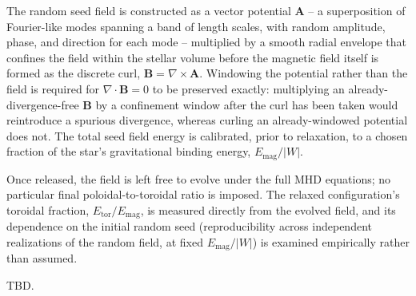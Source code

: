 \documentclass{aa}
\begin{document}
The random seed field is constructed as a vector potential $\mathbf{A}$
-- a superposition of Fourier-like modes spanning a band of length
scales, with random amplitude, phase, and direction for each mode --
multiplied by a smooth radial envelope that confines the field within
the stellar volume before the magnetic field itself is formed as the
discrete curl, $\mathbf{B} = \nabla\times\mathbf{A}$. Windowing the
potential rather than the field is required for
$\nabla\!\cdot\!\mathbf{B}=0$ to be preserved exactly: multiplying an
already-divergence-free $\mathbf{B}$ by a confinement window after the
curl has been taken would reintroduce a spurious divergence, whereas
curling an already-windowed potential does not. The total seed field
energy is calibrated, prior to relaxation, to a chosen fraction of the
star's gravitational binding energy, $E_{\mathrm{mag}}/|W|$.

Once released, the field is left free to evolve under the full MHD
equations; no particular final poloidal-to-toroidal ratio is imposed.
The relaxed configuration's toroidal fraction,
$E_{\mathrm{tor}}/E_{\mathrm{mag}}$, is measured directly from the
evolved field, and its dependence on the initial random seed
(reproducibility across independent realizations of the random field,
at fixed $E_{\mathrm{mag}}/|W|$) is examined empirically rather than
assumed.

\begin{acknowledgements}
TBD.
\end{acknowledgements}




\end{document}

